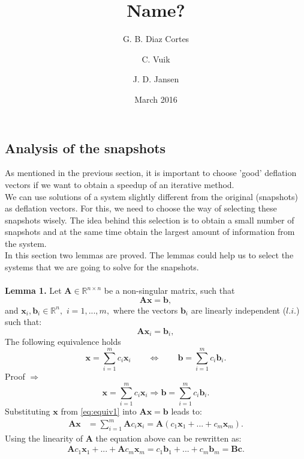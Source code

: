 \documentclass[12pt]{article}
\title{Name?}
\author[1]{G. B. Diaz Cortes}
\author[1]{C. Vuik}
\author[2]{J. D. Jansen}
\affil[1]{Department of Applied Mathematics, TU Delft}
\affil[2]{Department of Geoscience \& Engineering, TU Delft}
\date{March 2016}
\begin{document}




\subsection{Analysis of the snapshots}
As mentioned in the previous section, it is important to choose 'good' deflation vectors if we want to
obtain a speedup of an iterative method.\\ 
We can use solutions of a system slightly different from the original (snapshots) as deflation vectors.
For this, we need to choose the way of selecting these snapshots
wisely. The idea behind this selection is to obtain a small number of snapshots and at the same time
obtain the largest amount of information from the system.\\
In this section two lemmas are proved. The lemmas could help us to select the systems that we are going to solve for
the snapshots.\\\\
\textbf{Lemma 1.} 
Let $\mathbf{A} \in \mathbb{R}^{n\times n}$ be a non-singular matrix, such that
\begin{equation}\label{eq:ls}
\mathbf{A}\mathbf{x}=\mathbf{b},
\end{equation}
and $ \mathbf{x}_i, \mathbf{b}_i \in \mathbb{R}^{n},$ $i=1,...,m,$ where the vectors $\mathbf{b}_i$ are 
linearly independent ($l.i.$) such that: 
\begin{equation}\label{eq:lieq}
\mathbf{A}\mathbf{x}_i=\mathbf{b}_i,
\end{equation}
The following equivalence holds
\begin{equation}\label{eq:equiv}
\mathbf{x}=\sum_{i=1}^m {c}_i\mathbf{x}_i \qquad
\Leftrightarrow \qquad
\mathbf{b}=\sum_{i=1}^m {c}_i\mathbf{b}_i.
\end{equation}
Proof $\Rightarrow$
\begin{equation}\label{eq:equiv1}
\mathbf{x}=\sum_{i=1}^m {c}_i\mathbf{x}_i 
\Rightarrow 
\mathbf{b}=\sum_{i=1}^m {c}_i\mathbf{b}_i.
\end{equation}
Substituting $\mathbf{x}$ from \eqref{eq:equiv1} into $\mathbf{A}\mathbf{x}=\mathbf{b}$ leads to:
\begin{align*}
\mathbf{A}\mathbf{x}&=\sum_{i=1}^m \mathbf{A}{c}_i\mathbf{x}_i=\mathbf{A}(c_1\mathbf{x}_1+...+c_m\mathbf{x}_m).
\end{align*}
Using the linearity of $\mathbf{A}$ the equation above can be rewritten as:
\begin{align}\label{eq:bc}
\mathbf{A}c_1\mathbf{x}_1+...+\mathbf{A}c_m\mathbf{x}_m
=c_1\mathbf{b}_1+...+c_m\mathbf{b}_m=\mathbf{B}\mathbf{c}.
\end{align}
\end{document}
